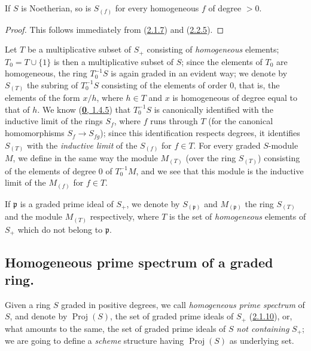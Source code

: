 \begin{corollary}[2.2.6]
\label{II.2.2.6}
If $S$ is Noetherian, so is $S_{(f)}$ for every homogeneous $f$
of degree $>0$.
\end{corollary}

\begin{proof}
This follows immediately from (\hyperref[II.2.1.7]{2.1.7}) and
(\hyperref[II.2.2.5]{2.2.5}).
\end{proof}

\begin{env}[2.2.7]
\label{II.2.2.7}
Let $T$ be a multiplicative subset of $S_+$ consisting of
\emph{homogeneous} elements; $T_0=T\cup\{1\}$ is then a multiplicative
subset of $S$; since the elements of $T_0$ are homogeneous, the ring
$T_0^{-1}S$ is again graded in an evident way; we denote by $S_{(T)}$ the
subring of $T_0^{-1}S$ consisting of the elements of order $0$, that is,
the elements of the form $x/h$, where $h\in T$ and $x$ is homogeneous of
degree equal to that of $h$. We know (\hyperref[0.1.4.5]{\textbf{0}, 1.4.5}) that
$T_0^{-1}S$ is canonically identified with the inductive limit of the rings
$S_f$, where $f$ runs through $T$ (for the canonical homomorphisms
$S_f\to S_{fg}$); since this identification respects degrees, it identifies
$S_{(T)}$ with the \emph{inductive limit} of the $S_{(f)}$ for $f\in T$.
For every graded $S$-module $M$, we define in the same way the module
$M_{(T)}$ (over the ring $S_{(T)}$) consisting of the elements of degree $0$
of $T_0^{-1}M$, and we see that this module is the inductive limit of the
$M_{(f)}$ for $f\in T$.

If $\mathfrak{p}$ is a graded prime ideal of $S_+$, we denote by
$S_{(\mathfrak{p})}$ and $M_{(\mathfrak{p})}$ the ring $S_{(T)}$ and the
module $M_{(T)}$ respectively, where $T$ is the set of \emph{homogeneous}
elements of $S_+$ which do not belong to $\mathfrak{p}$.
\end{env}

\subsection{Homogeneous prime spectrum of a graded ring.}
\label{subsection:II.2.3}

\begin{env}[2.3.1]
\label{II.2.3.1}
Given a ring $S$ graded in positive degrees, we call
\emph{homogeneous prime spectrum} of $S$, and denote by
$\operatorname{Proj}(S)$, the set of graded prime ideals of $S_+$
(\hyperref[II.2.1.10]{2.1.10}), or, what amounts to the same, the set
of graded prime ideals of $S$ \emph{not containing} $S_+$; we
are going to define a \emph{scheme} structure having
$\operatorname{Proj}(S)$ as underlying set.
\end{env}

